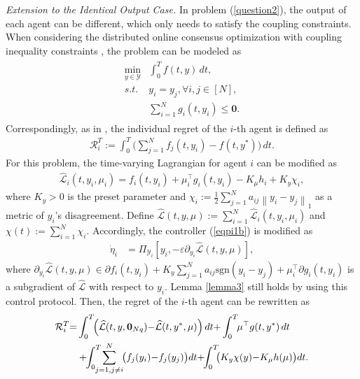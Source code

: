 \documentclass[final,5p,times,twocolumn,authoryear]{elsarticle}
\newcommand{\sign}[1]{\mathrm{sgn}(#1)}
\begin{document}
	
	
	
	
	{\em Extension to the Identical Output Case.}
	In problem (\ref{question2}), the output of each agent can be different, which only needs to satisfy the coupling constraints. When considering the distributed online consensus optimization with coupling inequality constraints \citep{lxx2020c}, the problem can be modeled as
	\begin{align}
		\begin{split}
			\min_{y \in \mathcal{Y}} &\int_{0}^{T} f(t,y)\,dt ,\\
			s.t.\  &y_i=y_j, \forall i,j\in[N],\\
			&\sum_{i=1}^{N}g_{i}(t, y_i)\le \boldsymbol0.\label{question3}
		\end{split}
	\end{align}
	Correspondingly, as in \citet{pater2020, ydm2022}, the individual regret of the $i$-th agent is defined as
	\begin{align}
		\mathcal{R}_i^T:=\int_{0}^{T} \Big(\sum_{j=1}^N f_j(t,y_i)-f(t,y^*)\Big)\,dt.
	\end{align}
	For this problem, the time-varying Lagrangian for agent $i$ can be modified as
	\begin{align}
		\widehat{\mathcal{L}}_i(t,y_i,\mu_i)=f_i(t,y_i)+\mu_i^\top g_i(t,y_i) - K_\mu h_i + K_y \chi_i,\label{la2}
	\end{align}
	where $K_y>0$ is the preset parameter and $\chi_i:= \frac{1}{2}\sum_{j=1}^N a_{ij}\left\|y_i-y_j\right\|_1$ as a metric of $y_i$'s disagreement. Define $\widehat{\mathcal{L}}(t,y,\mu) := \sum_{i=1}^{N}\widehat{\mathcal{L}}_i(t,y_i,\mu_i)$ and $\chi(t):=\sum_{i=1}^{N} \chi_i$.	
	Accordingly, the controller (\ref{eqpi1b}) is modified as
	\begin{align}
		\dot{\eta}_i&=\Pi_{\mathcal{Y}_i}[y_i, -\varepsilon \partial_{y_i}\widehat{\mathcal{L}}(t,y,\mu)],
	\end{align}
	where $\partial_{y_i}\widehat{\mathcal{L}}(t,y,\mu)\in \partial f_i(t,y_i) + K_y\sum_{j=1}^N a_{ij}\sign{y_i-y_j} +\mu_i^\top \partial g_i(t,y_i)$ is a subgradient of $\widehat{\mathcal{L}}$ with respect to $y_i$. Lemma \ref{lemma3} still holds by using this control protocol. Then, the regret of the $i$-th agent can be rewritten as
	\begin{align}
		\mathcal{R}_i^T{=}
		&\int_{0}^{T} \!\!\left(\widehat{\mathcal{L}}(t,y,\boldsymbol{0}_{Nq}) {-} \widehat{\mathcal{L}}(t,y^*,\mu)\right)dt
		{+}\int_{0}^{T} \!\!\mu^\top g(t,y^*)\, dt\notag\\
		&+\!\!\int_{0}^{T}\!\!\!\!\! \sum_{j=1,j\neq i}^N\!\! \big(f_j(y_i){-}f_j(y_j)\big)dt  {+}\!\!\int_{0}^{T}\!\!\!\big(K_y\chi(y){-}K_\mu h(\mu)\big) dt.
	\end{align}
\end{document}
